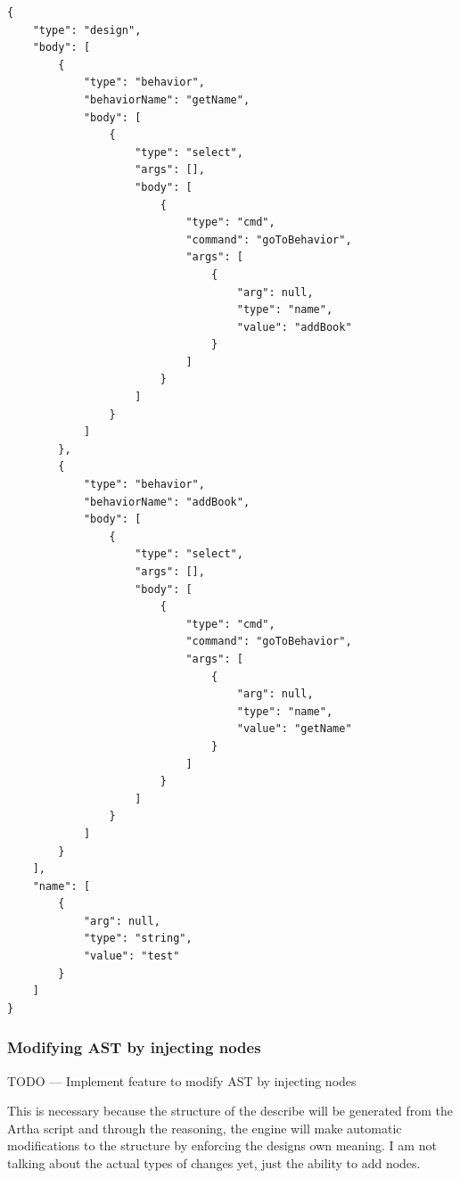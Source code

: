 \begin{verbatim}
{
    "type": "design",
    "body": [
        {
            "type": "behavior",
            "behaviorName": "getName",
            "body": [
                {
                    "type": "select",
                    "args": [],
                    "body": [
                        {
                            "type": "cmd",
                            "command": "goToBehavior",
                            "args": [
                                {
                                    "arg": null,
                                    "type": "name",
                                    "value": "addBook"
                                }
                            ]
                        }
                    ]
                }
            ]
        },
        {
            "type": "behavior",
            "behaviorName": "addBook",
            "body": [
                {
                    "type": "select",
                    "args": [],
                    "body": [
                        {
                            "type": "cmd",
                            "command": "goToBehavior",
                            "args": [
                                {
                                    "arg": null,
                                    "type": "name",
                                    "value": "getName"
                                }
                            ]
                        }
                    ]
                }
            ]
        }
    ],
    "name": [
        {
            "arg": null,
            "type": "string",
            "value": "test"
        }
    ]
}
\end{verbatim}

\subsubsection{Modifying AST by injecting nodes}

TODO
---
Implement feature to modify AST by injecting nodes

This is necessary because the structure of the describe will be generated from the Artha script and through the reasoning, the engine will make automatic modifications to the structure by enforcing the designs own meaning. I am not talking about the actual types of changes yet, just the ability to add nodes.
